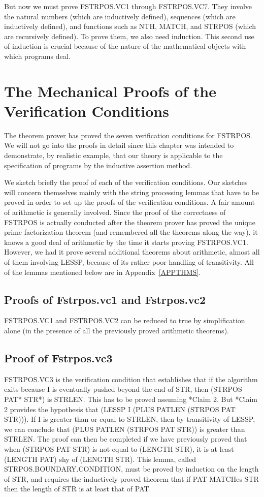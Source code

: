 \documentclass[10pt]{book}
\begin{document}
But now we must prove FSTRPOS.VC1 through FSTRPOS.VC7.  They involve
the natural numbers (which are inductively defined), sequences (which are
inductively defined), and functions such as NTH, MATCH, and
STRPOS (which are recursively defined).  To prove them, we also  need
induction.  This second use of induction is crucial because of
the nature of the mathematical objects with which programs deal.

\section{The Mechanical Proofs of the Verification Conditions}
The theorem prover has proved the seven verification conditions for
FSTRPOS.  We will not go into the proofs in detail since this chapter
was intended to demonstrate, by realistic example, that our theory is applicable
to the specification of programs by the inductive assertion method.

We  sketch briefly the proof of each of the verification conditions.
Our sketches will concern themselves mainly with the string processing
lemmas that have to be proved in order to set up the proofs of the
verification conditions.  A fair amount of arithmetic
is generally involved.  Since the proof of the correctness of FSTRPOS is
actually conducted after the theorem prover has proved the unique
prime factorization theorem (and remembered all the theorems along the way),
it knows a good deal of arithmetic by the time it starts proving FSTRPOS.VC1.
However, we had  it prove several additional theorems about arithmetic,
almost all of them involving LESSP, because of its rather poor handling
of transitivity.  All of the lemmas mentioned below are in Appendix~\ref{APPTHMS}.

\subsection{Proofs of Fstrpos.vc1 and Fstrpos.vc2}
FSTRPOS.VC1 and FSTRPOS.VC2 can be reduced to true by simplification alone
(in the presence of all the previously proved arithmetic theorems).

\subsection{Proof of Fstrpos.vc3}
FSTRPOS.VC3 is the verification condition that establishes that
if the algorithm exits because I is eventually pushed beyond the end
of STR, then (STRPOS PAT* STR*) is STRLEN.  This has to be proved
assuming *Claim 2.  But *Claim 2 provides the hypothesis that
(LESSP I (PLUS PATLEN (STRPOS PAT STR))).  If I is greater than or equal to
STRLEN, then by transitivity of LESSP, we can conclude that (PLUS PATLEN (STRPOS PAT STR)) is greater than
STRLEN.  The proof can then be completed if we have previously proved
that when (STRPOS PAT STR) is not equal to (LENGTH STR), it is at least
(LENGTH PAT) shy of (LENGTH STR).  This lemma, called STRPOS.BOUNDARY.CONDITION,
must be proved by induction on the length of STR, and requires the
inductively proved theorem that if PAT MATCHes STR then the length of
STR is at least that of PAT.
\end{document}
